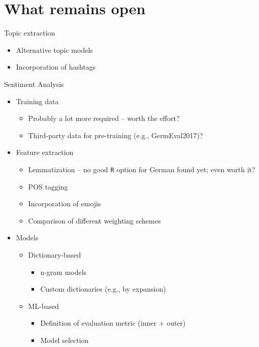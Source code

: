 \documentclass[12pt]{article}
\begin{document}
\newpage

\section*{What remains open}

  \item Topic extraction
  \begin{itemize}
    \item Alternative topic models
    \item Incorporation of hashtags
  \end{itemize}
  \item Sentiment Analysis
  \begin{itemize}
    \item Training data
    \begin{itemize}
      \item Probably a lot more required -- worth the effort?
      \item Third-party data for pre-training (e.g., GermEval2017)?
    \end{itemize}
    \item Feature extraction
    \begin{itemize}
      \item Lemmatization -- no good \texttt{R} option for German found yet;
      even worth it?
      \item POS tagging
      \item Incorporation of emojis
      \item Comparison of different weighting schemes
    \end{itemize}
    \item Models
    \begin{itemize}
      \item Dictionary-based
      \begin{itemize}
        \item n-gram models
        \item Custom dictionaries (e.g., by expansion)
      \end{itemize}
      \item ML-based
      \begin{itemize}
        \item Definition of evaluation metric (inner + outer)
        \item Model selection
      \end{itemize}
    \end{itemize}
  \end{itemize}
\end{document}
